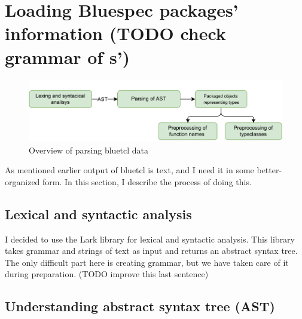 \documentclass[12pt]{report}
\begin{document}
\section{Loading Bluespec packages' information (TODO check grammar of s')}  

\begin{figure}[!h]  
   \centering  
   \caption{Overview of parsing bluetcl data}  
   \includegraphics[width=1.0\columnwidth]{pdfExports/LargeMapProcessing.pdf}  
\end{figure}  

As mentioned earlier output of bluetcl is text, and I need it in some better-organized form. In this section, I describe the process of doing this.  
\subsection{Lexical and syntactic analysis}  
I decided to use the Lark library for lexical and syntactic analysis. This library takes grammar and strings of text as input and returns an abstract syntax tree. The only difficult part here is creating grammar, but we have taken care of it during preparation. (TODO improve this last sentence)  
\subsection{Understanding abstract syntax tree (AST)}  
\end{document}
